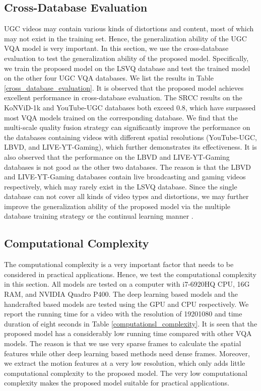 \documentclass[sigconf]{acmart}
\begin{document}
\subsection{Cross-Database Evaluation}
UGC videos may contain various kinds of distortions and content, most of which may not exist in the training set. Hence, the generalization ability of the UGC VQA model is very important. In this section, we use the cross-database evaluation to test the generalization ability of the proposed model. Specifically, we train the proposed model on the LSVQ database and test the trained model on the other four UGC VQA databases. We list the results in Table \ref{cross_database_evaluation}. It is observed that the proposed model achieves excellent performance in cross-database evaluation. The SRCC results on the KoNViD-1k and YouTube-UGC databases both exceed 0.8, which have surpassed most VQA models trained on the corresponding database. We find that the multi-scale quality fusion strategy can significantly improve the performance on the databases containing videos with different spatial resolutions (YouTube-UGC, LBVD, and LIVE-YT-Gaming), which further demonstrates its effectiveness. It is also observed that the performance on the LBVD and LIVE-YT-Gaming databases is not good as the other two databases. The reason is that the LBVD and LIVE-YT-Gaming databases contain live broadcasting and gaming videos respectively, which may rarely exist in the LSVQ database. Since the single database can not cover all kinds of video types and distortions, we may further improve the generalization ability of the proposed model via the multiple database training strategy \cite{sun2021blind} \cite{zhang2021uncertainty} or the continual learning manner \cite{zhang2021continual} \cite{zhang2021task}.



\subsection{Computational Complexity}
The computational complexity is a very important factor that needs to be considered in practical applications. Hence, we test the computational complexity in this section. All models are tested on a computer with i7-6920HQ CPU, 16G RAM, and NVIDIA Quadro P400. The deep learning based models and the handcrafted based models are tested using the GPU and CPU respectively. We report the running time for a video with the resolution of 19201080 and time duration of eight seconds in Table \ref{computationsl_complexity}. It is seen that the proposed model has a considerably low running time compared with other VQA models. The reason is that we use very sparse frames to calculate the spatial features while other deep learning based methods need dense frames. Moreover, we extract the motion features at a very low resolution, which only adds little computational complexity to the proposed model. The very low computational complexity makes the proposed model suitable for practical applications.
\end{document}
